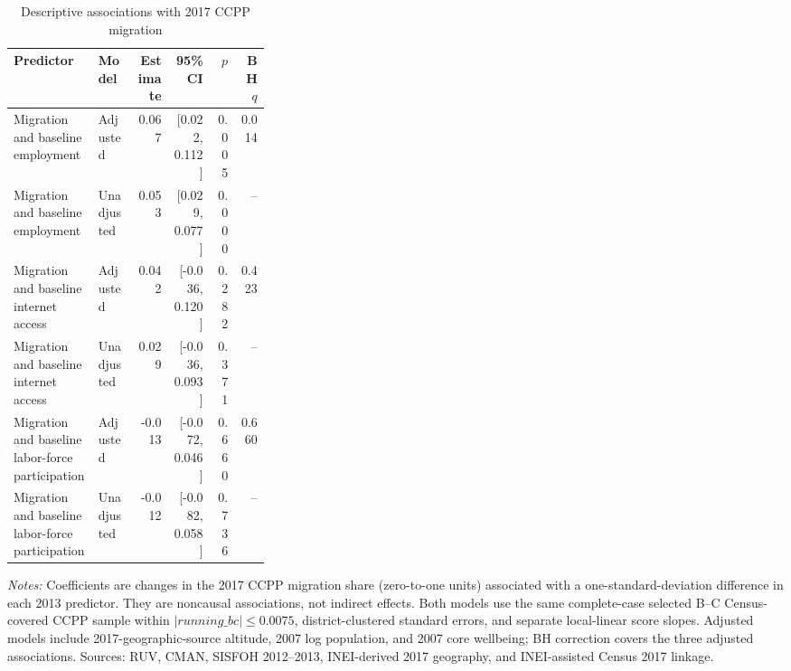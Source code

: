 \begin{table}[!htbp]
\centering\small
\caption{Descriptive associations with 2017 CCPP migration}
\label{tab:rd_mechanisms_associations}
\begin{tabular}{p{0.33\linewidth}lrrrr}
\toprule
Predictor & Model & Estimate & 95\% CI & \(p\) & BH \(q\) \\
\midrule
Migration and baseline employment & Adjusted & 0.067 & [0.022, 0.112] & 0.005 & 0.014 \\
Migration and baseline employment & Unadjusted & 0.053 & [0.029, 0.077] & 0.000 & -- \\
Migration and baseline internet access & Adjusted & 0.042 & [-0.036, 0.120] & 0.282 & 0.423 \\
Migration and baseline internet access & Unadjusted & 0.029 & [-0.036, 0.093] & 0.371 & -- \\
Migration and baseline labor-force participation & Adjusted & -0.013 & [-0.072, 0.046] & 0.660 & 0.660 \\
Migration and baseline labor-force participation & Unadjusted & -0.012 & [-0.082, 0.058] & 0.736 & -- \\
\bottomrule\end{tabular}
\parbox{0.97\linewidth}{\footnotesize \textit{Notes:} Coefficients are changes in the 2017 CCPP migration share (zero-to-one units) associated with a one-standard-deviation difference in each 2013 predictor. They are noncausal associations, not indirect effects. Both models use the same complete-case selected B--C Census-covered CCPP sample within \(|running\_bc|\leq0.0075\), district-clustered standard errors, and separate local-linear score slopes. Adjusted models include 2017-geographic-source altitude, 2007 log population, and 2007 core wellbeing; BH correction covers the three adjusted associations. Sources: RUV, CMAN, SISFOH 2012--2013, INEI-derived 2017 geography, and INEI-assisted Census 2017 linkage.}
\end{table}

